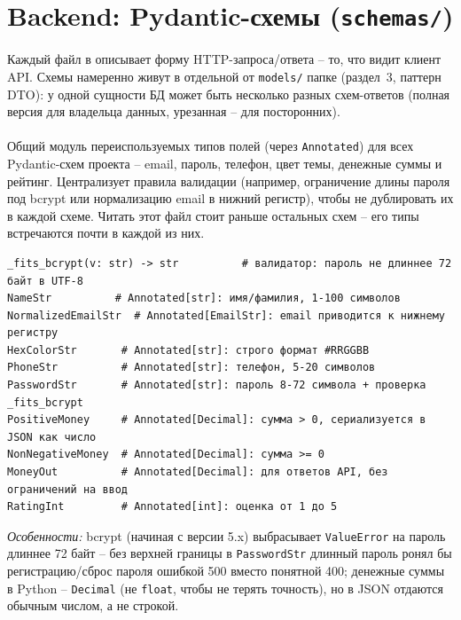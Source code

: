 \section{Backend: Pydantic-схемы (\texttt{schemas/})}

Каждый файл в  описывает форму
HTTP-запроса/ответа -- то, что видит клиент API. Схемы намеренно живут в
отдельной от \texttt{models/} папке (раздел~3, паттерн DTO): у одной
сущности БД может быть несколько разных схем-ответов (полная версия для
владельца данных, урезанная -- для посторонних).

\paragraph{}
Общий модуль переиспользуемых типов полей (через \texttt{Annotated}) для
всех Pydantic-схем проекта -- email, пароль, телефон, цвет темы, денежные
суммы и рейтинг. Централизует правила валидации (например, ограничение
длины пароля под bcrypt или нормализацию email в нижний регистр), чтобы
не дублировать их в каждой схеме. Читать этот файл стоит раньше
остальных схем -- его типы встречаются почти в каждой из них.
\begin{verbatim}
_fits_bcrypt(v: str) -> str          # валидатор: пароль не длиннее 72 байт в UTF-8
NameStr          # Annotated[str]: имя/фамилия, 1-100 символов
NormalizedEmailStr  # Annotated[EmailStr]: email приводится к нижнему регистру
HexColorStr       # Annotated[str]: строго формат #RRGGBB
PhoneStr          # Annotated[str]: телефон, 5-20 символов
PasswordStr       # Annotated[str]: пароль 8-72 символа + проверка _fits_bcrypt
PositiveMoney     # Annotated[Decimal]: сумма > 0, сериализуется в JSON как число
NonNegativeMoney  # Annotated[Decimal]: сумма >= 0
MoneyOut          # Annotated[Decimal]: для ответов API, без ограничений на ввод
RatingInt         # Annotated[int]: оценка от 1 до 5
\end{verbatim}
\textit{Особенности:} bcrypt (начиная с версии 5.x) выбрасывает
\texttt{ValueError} на пароль длиннее 72 байт -- без верхней границы в
\texttt{PasswordStr} длинный пароль ронял бы регистрацию/сброс пароля
ошибкой 500 вместо понятной 400; денежные суммы в Python -- \texttt{Decimal}
(не \texttt{float}, чтобы не терять точность), но в JSON отдаются обычным
числом, а не строкой.


